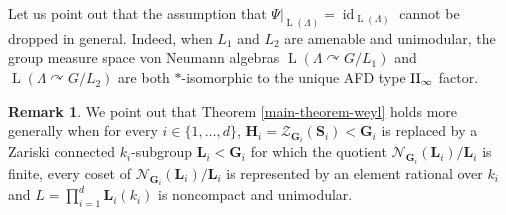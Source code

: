 \documentclass[11pt]{amsart}
\numberwithin{equation}{section}
\theoremstyle{plain}
\theoremstyle{definition}
\newtheorem{rem}[thm]{Remark}
\newcommand{\id}{\operatorname{id}}
\newcommand{\rL}{\operatorname{ L}}
\begin{document}
Let us point out that the assumption that $\Psi|_{\rL(\Lambda)} = \id_{\rL(\Lambda)}$ cannot be dropped in general. Indeed, when $L_1$ and $L_2$ are amenable and unimodular, the group measure space von Neumann algebras $\rL(\Lambda \curvearrowright G/L_1)$ and $\rL(\Lambda \curvearrowright G/L_2)$ are both $\ast$-isomorphic to the unique AFD type ${\rm II_\infty}$ factor.

\begin{rem}
We point out that Theorem \ref{main-theorem-weyl} holds more generally when for every $i \in \{1, \dots, d\}$, $\mathbf H_i = \mathscr Z_{\mathbf G_i}(\mathbf S_i) < \mathbf G_i$ is replaced by a Zariski connected $k_i$-subgroup $\mathbf L_i < \mathbf G_i$ for which the quotient $\mathscr N_{\mathbf G_i}(\mathbf L_i)/\mathbf L_i$ is finite, every coset of $\mathscr N_{\mathbf G_i}(\mathbf L_i)/\mathbf L_i$ is represented by an element rational over $k_i$ and $L = \prod_{i = 1}^{d}\mathbf L_i(k_i)$ is noncompact and unimodular. 
\end{rem}
\end{document}
